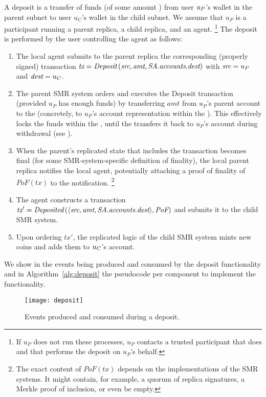 A deposit is a transfer of funds (of some amount \fil) from user $u_P$'s wallet in the parent subnet to user $u_C$'s wallet in the child subnet.
We assume that $u_P$ is a participant running a parent replica, a child replica, and an \nameAbbr agent.%
\footnote{If $u_P$ does not run these processes, $u_P$ contacts a trusted participant that does and that performs the deposit on $u_P$'s behalf.}
The deposit is performed by the user controlling the \nameAbbr agent as follows:
\begin{enumerate}
    \item The local \nameAbbr agent submits to the parent \smr replica the corresponding (properly signed) transaction
    $\textit{tx}=\textit{Deposit}\left( \textit{src}, \textit{amt}, \textit{SA}.\textit{accounts}.\textit{dest} \right)$ with $\textit{src}=u_P$ and $\textit{dest} = u_C$.
    \item The parent SMR system orders and executes the Deposit transaction (provided $u_P$ has enough funds) by transferring $amt$ from $u_P$'s parent account to the \sa (concretely, to $u_P$'s account representation within the \sa). This effectively locks the funds within the \sa \dapp, until the \sa \dapp transfers it back to $u_P$'s account during withdrawal (see ).
    \item When the parent's replicated state that includes the transaction becomes final (for some SMR-system-specific definition of finality), the local parent replica notifies the local \nameAbbr agent, potentially attaching a proof of finality of $PoF(tx)$ to the notification.%
    \footnote{The exact content of $PoF(tx)$ depends on the implementations of the SMR systems. It might contain, for example, a quorum of replica signatures, a Merkle proof of inclusion, or even be empty.}
    \item The \nameAbbr agent constructs a transaction $\textit{tx}' = \textit{Deposited}\left(\langle  \textit{src}, \textit{amt}, \textit{SA}.\textit{accounts}.\textit{dest} \rangle, \textit{PoF} \right)$ and submits it to the child SMR system.
    \item Upon ordering $tx'$, the replicated logic of the child SMR system mints \fil new coins and adds them to $u_C$'s account.
\end{enumerate}

We show in  the events being produced and consumed by the deposit functionality and in Algorithm~\ref{alg:deposit} the pseudocode per component to implement the functionality.

\begin{figure}[h]
     \centering
     \texttt{[image: deposit]}
     \caption{Events produced and consumed during a deposit.}
     \label{fig:deposit}
\end{figure}
 

